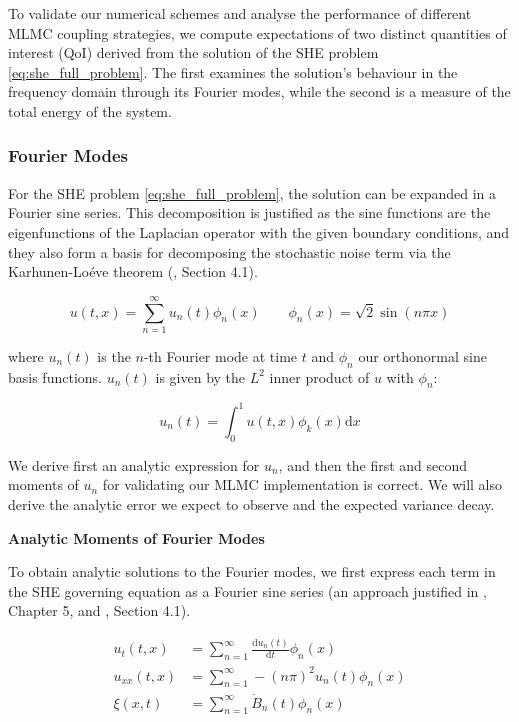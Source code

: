 To validate our numerical schemes and analyse the performance 
of different MLMC coupling strategies, we compute expectations
of two distinct quantities of interest (QoI) derived from the solution 
of the SHE problem \eqref{eq:she_full_problem}.
The first examines the solution's behaviour in the frequency domain through 
its Fourier modes, while the second is a measure of the total energy of the 
system. 

\subsubsection{Fourier Modes}

For the SHE problem \eqref{eq:she_full_problem}, 
the solution can be expanded in a Fourier sine series. This 
decomposition is justified 
as the sine functions are the eigenfunctions of the Laplacian 
operator with the given boundary conditions, and they also form a basis 
for decomposing the stochastic noise term via the Karhunen-Loéve theorem
(\cite{da2014stochastic}, Section 4.1).

\begin{equation*}
    u(t,x) = \sum_{n=1}^\infty u_n(t)\phi_n(x) \qquad \phi_n(x) = \sqrt{2}\sin (n\pi x)
\end{equation*}

where $u_n(t)$ is the $n$-th Fourier mode at time $t$ and $\phi_n$ our 
orthonormal sine basis functions. $u_n(t)$ is given by the $L^2$ 
inner product of $u$ with $\phi_n$:

\begin{equation*}
    u_n(t) = \int_0^1 u(t,x)\phi_k(x)\mathrm{d}x
\end{equation*}

We derive first an analytic expression for $u_n$, 
and then the first and second moments of $u_n$ for validating our 
MLMC implementation is correct. We will also derive the 
analytic error we expect to observe and 
the expected variance decay. 
\newline

\textbf{Analytic Moments of Fourier Modes}

To obtain analytic solutions to the Fourier modes, we first express each term 
in the SHE governing equation as a Fourier sine series (an approach justified 
in \cite{strauss2007partial}, Chapter 5, and \cite{da2014stochastic}, Section 4.1).

$$
\begin{aligned} 
    u_t(t,x) &= \sum_{n=1}^\infty \frac{\mathrm{d}u_n(t)}{\mathrm{d}t}\phi_n(x) \\ 
    u_{xx}(t,x) &= \sum_{n=1}^\infty -(n\pi)^2 u_n(t)\phi_n(x) \\ 
    \xi(x,t) &= \sum_{n=1}^\infty \dot{B}_n(t) \phi_n(x) 
\end{aligned}
$$

